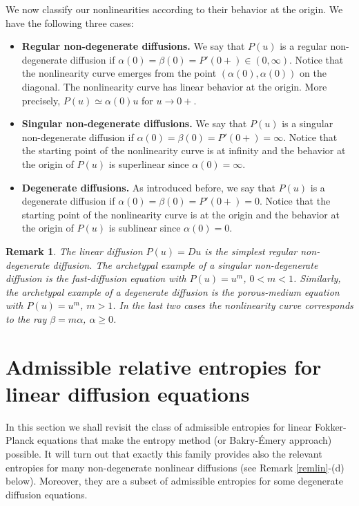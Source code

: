\documentclass[reqno]{amsart}
\newtheorem{remark}[lemma]{Remark}
\begin{document}
We now classify our nonlinearities according to their behavior at the origin. We have the following three cases:
\begin{itemize}
\item[1.] {\bf Regular non-degenerate diffusions.} We say that $P(u)$ is a regular non-degenerate diffusion if $\alpha(0)=\beta(0)=P'(0+)\in(0,\infty)$. Notice that the nonlinearity curve emerges from the point $(\alpha(0),\alpha(0))$ on the diagonal. The nonlinearity curve has linear behavior at the origin. More precisely, $P(u)\simeq \alpha(0) u$ for $u\to 0+$.

\item[2.] {\bf Singular non-degenerate diffusions.} We say that $P(u)$ is a singular non-degenerate diffusion if $\alpha(0)=\beta(0)=P'(0+)=\infty$. Notice that the starting point of the nonlinearity curve is at infinity and the behavior at the origin of $P(u)$ is superlinear since $\alpha(0)=\infty$. 

\item[3.] {\bf Degenerate diffusions.} As introduced before, we say that $P(u)$ is a degenerate diffusion if $\alpha(0)=\beta(0)=P'(0+)=0$. Notice that the starting point of the nonlinearity curve is at the origin and the behavior at the origin of $P(u)$ is sublinear since $\alpha(0)=0$. 
\end{itemize}

\begin{remark}%
The linear diffusion $P(u)=Du$ is the simplest regular non-degenerate diffusion.
The archetypal example of a singular non-degenerate diffusion is the fast-diffusion equation with $P(u)=u^m$, $0<m<1$. Similarly, the archetypal example of a degenerate diffusion is the porous-medium equation with $P(u)=u^m$, $m>1$. In the last two cases the nonlinearity curve corresponds to the ray $\beta=m\alpha$, $\alpha\ge0$. 
\end{remark}

\section{Admissible relative entropies for linear diffusion equations}
\label{sct:linear}
\setcounter{equation}{0}

In this section we shall revisit the class of admissible entropies for linear Fokker-Planck equations that make the entropy method (or Bakry-\'Emery approach) possible. It will turn out that exactly this family provides also the relevant entropies for many non-degenerate nonlinear diffusions (see Remark \ref{remlin}-(d) below). Moreover, they are a subset of admissible entropies for some degenerate diffusion equations.
\end{document}
